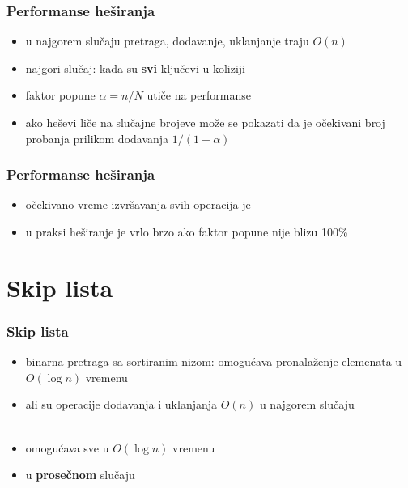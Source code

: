 \documentclass[compress]{beamer}
\begin{document}
\begin{frame}[fragile]
  \frametitle{Performanse heširanja}
  \begin{itemize}
    \item u najgorem slučaju pretraga, dodavanje, uklanjanje traju $O(n)$
    \item najgori slučaj: kada su \textbf{svi} ključevi u koliziji
    \item faktor popune $\alpha = n/N$ utiče na performanse
    \item ako heševi liče na slučajne brojeve može se pokazati da je očekivani broj probanja prilikom dodavanja $1/(1-\alpha)$
  \end{itemize}
\end{frame}

\begin{frame}[fragile]
  \frametitle{Performanse heširanja}
  \begin{itemize}
    \item očekivano vreme izvršavanja svih operacija je 
    \item u praksi heširanje je vrlo brzo ako faktor popune nije blizu 100\%
  \end{itemize}
\end{frame}

\section[Skip lista]{Skip lista}
\begin{frame}[fragile]
  \frametitle{Skip lista}
  \begin{itemize}
    \item binarna pretraga sa sortiranim nizom: omogućava pronalaženje elemenata u $O(\log n)$ vremenu
    \item ali su operacije dodavanja i uklanjanja $O(n)$ u najgorem slučaju \\ \ \\
    \item {} omogućava sve u $O(\log n)$ vremenu
    \item u \textbf{prosečnom} slučaju
  \end{itemize}
\end{frame}
\end{document}
